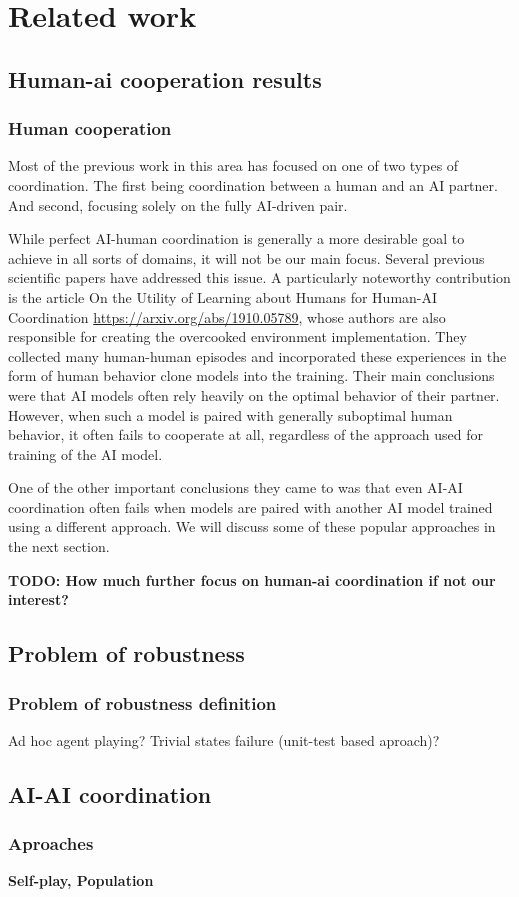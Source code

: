 \chapter{Related work}
\section{Human-ai cooperation results}

\subsection{Human cooperation}
Most of the previous work in this area has focused on one of two types of coordination. 
The first being coordination between a human and an AI partner. 
And second, focusing solely on the fully AI-driven pair.

\par

While perfect AI-human coordination is generally a more desirable goal to achieve in all sorts of domains, it will not be our main focus.  
Several previous scientific papers have addressed this issue. A particularly noteworthy contribution is the article 
On the Utility of Learning about Humans for Human-AI Coordination
\url{https://arxiv.org/abs/1910.05789}, whose authors are also responsible for creating the overcooked environment implementation. 
They collected many human-human episodes and incorporated these experiences in the form of human behavior clone models into the training. Their main conclusions were that AI models often rely heavily on the optimal behavior of their partner. 
However, when such a model is paired with generally suboptimal human behavior, it often fails to cooperate at all, regardless of the approach used for training of the AI model.

One of the other important conclusions they came to was that even AI-AI coordination often fails when models are paired with another AI model trained using a different approach. 
We will discuss some of these popular approaches in the next section.

\textbf{TODO: How much further focus on human-ai coordination if not our interest?}


\section{Problem of robustness}


\subsection{Problem of robustness definition}
Ad hoc agent playing? Trivial states failure (unit-test based aproach)?

\section{AI-AI coordination}
\subsection{Aproaches}
\textbf{Self-play, Population}






